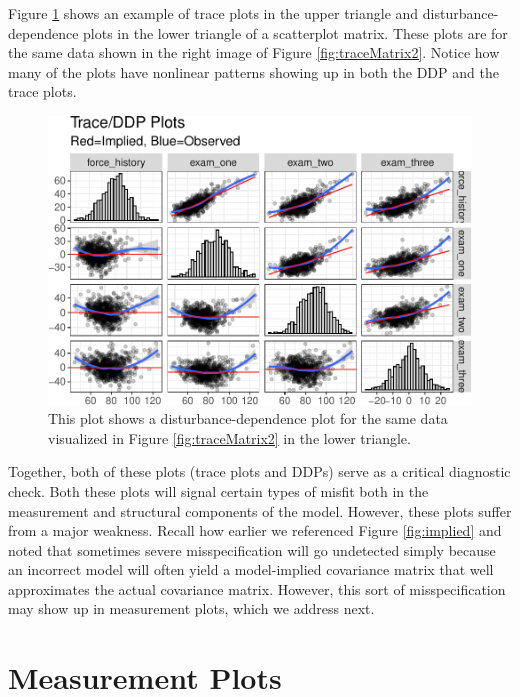 \documentclass[
  english,
  doc]{apa6}
\begin{document}
Figure \ref{fig:ddp} shows an example of trace plots in the upper triangle and disturbance-dependence plots in the lower triangle of a scatterplot matrix. These plots are for the same data shown in the right image of Figure \ref{fig:traceMatrix2}. Notice how many of the plots have nonlinear patterns showing up in both the DDP and the trace plots.



\begin{figure}
\centering
\includegraphics{flexplavaan_draft_files/figure-latex/ddp-1.pdf}
\caption{\label{fig:ddp}This plot shows a disturbance-dependence plot for the same data visualized in Figure \ref{fig:traceMatrix2} in the lower triangle.}
\end{figure}

Together, both of these plots (trace plots and DDPs) serve as a critical diagnostic check. Both these plots will signal certain types of misfit both in the measurement and structural components of the model. However, these plots suffer from a major weakness. Recall how earlier we referenced Figure \ref{fig:implied} and noted that sometimes severe misspecification will go undetected simply because an incorrect model will often yield a model-implied covariance matrix that well approximates the actual covariance matrix. However, this sort of misspecification may show up in measurement plots, which we address next.

\hypertarget{measurement-plots}{%
\section{Measurement Plots}\label{measurement-plots}}
\end{document}
